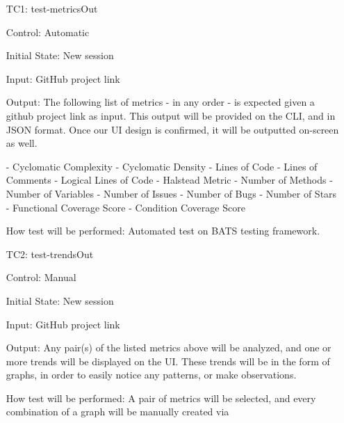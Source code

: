 \documentclass[12pt, titlepage]{article}
\begin{document}
\begin{enumerate}
\item[TC1:] test-metricsOut 

Control: Automatic
					
Initial State: New session 
					
Input: GitHub project link

Output: The following list of metrics - in any order - is expected given a github project link as input. This output will be provided on the CLI, and in JSON format. Once our UI design is confirmed, it will be outputted on-screen as well.

- Cyclomatic Complexity \newline
- Cyclomatic Density\newline
- Lines of Code \newline
- Lines of Comments\newline
- Logical Lines of Code \newline
- Halstead Metric \newline
- Number of Methods\newline
- Number of Variables\newline 
- Number of Issues\newline
- Number of Bugs\newline
- Number of Stars\newline
- Functional Coverage Score\newline
- Condition Coverage Score 
					
How test will be performed: Automated test on BATS testing framework. 

\item[TC2:] test-trendsOut

Control: Manual
		
Initial State: New session 
					
Input: GitHub project link
					
Output: Any pair(s) of the listed metrics above will be analyzed, and one or more trends will be displayed on the UI. These trends will be in the form of graphs, in order to easily notice any patterns, or make observations. 

How test will be performed: A pair of metrics will be selected, and every combination of a graph will be manually created via 
\end{enumerate}
\end{document}
